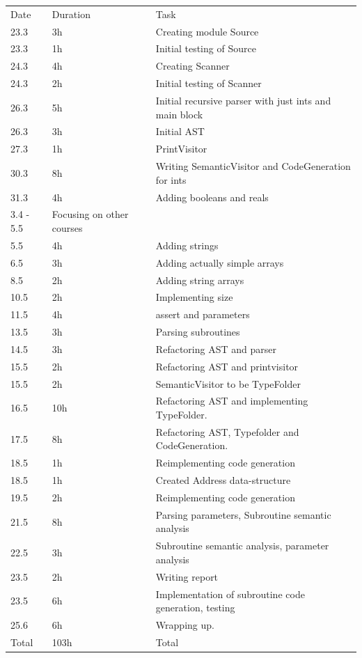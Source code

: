 \documentclass[12pt,a4paper]{article}
\begin{document}
\begin{center}
  \begin{tabular}{l l l}
    \bottomrule
    Date & Duration & Task \\
    23.3 & 3h & Creating module Source \\
    \bottomrule
    23.3 & 1h & Initial testing of Source \\
    \bottomrule
    24.3 & 4h & Creating Scanner \\
    \bottomrule
    24.3 & 2h & Initial testing of Scanner \\
    \bottomrule
    26.3 & 5h & Initial recursive parser with just ints and main block\\
    \bottomrule
    26.3 & 3h & Initial AST \\
    \bottomrule
    27.3 & 1h & PrintVisitor \\
    \bottomrule
    30.3 & 8h & Writing SemanticVisitor and CodeGeneration for ints\\
    \bottomrule
    31.3 & 4h & Adding booleans and reals \\
    \bottomrule
    3.4 - 5.5 & Focusing on other courses \\
    \bottomrule
    5.5 & 4h & Adding strings \\
    \bottomrule
    6.5 & 3h & Adding actually simple arrays \\
    \bottomrule
    8.5 & 2h & Adding string arrays \\
    \bottomrule
    10.5 & 2h & Implementing size \\
    \bottomrule
    11.5 & 4h & assert and parameters \\
    \bottomrule
    13.5 & 3h & Parsing subroutines \\
    \bottomrule
    14.5 & 3h & Refactoring AST and parser \\
    \bottomrule
    15.5 & 2h & Refactoring AST and printvisitor\\
    \bottomrule
    15.5 & 2h & SemanticVisitor to be TypeFolder\\
    \bottomrule
    16.5 & 10h & Refactoring AST and implementing TypeFolder.\\
    \bottomrule
    17.5 & 8h & Refactoring AST, Typefolder and CodeGeneration.\\
    \bottomrule
    18.5 & 1h & Reimplementing code generation\\
    \bottomrule
    18.5 & 1h & Created Address data-structure\\
    \bottomrule
    19.5 & 2h & Reimplementing code generation\\
    \bottomrule
    21.5 & 8h & Parsing parameters, Subroutine semantic analysis \\
    \bottomrule
    22.5 & 3h & Subroutine semantic analysis, parameter analysis\\
    \bottomrule
    23.5 & 2h & Writing report\\
    \bottomrule
    23.5 & 6h & Implementation of subroutine code generation, testing\\
    \bottomrule
    25.6 & 6h & Wrapping up. \\
    \bottomrule
    Total & 103h & Total
  \end{tabular}
\end{center}
\end{document}
